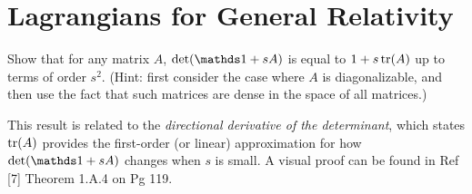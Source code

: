 \documentclass[10pt]{article}
\begin{document}
\newpage
\section{Lagrangians for General Relativity}\label{b3c3}






\begin{example}
	Show that for any matrix $A$, $\det(\id+sA)$ is equal to $1+s\tr(A)$ up to terms of order $s^2$. (Hint: first consider the case where $A$ is diagonalizable, and then use the fact that such matrices are dense in the space of all matrices.)
\end{example}
\sol This result is related to the \emph{directional derivative of the determinant}, which states $\tr(A)$ provides the first-order (or linear) approximation
for how $\det(\id+sA)$ changes when $s$ is small. A visual proof can be found in Ref [7] Theorem 1.A.4 on Pg 119.
\end{document}
